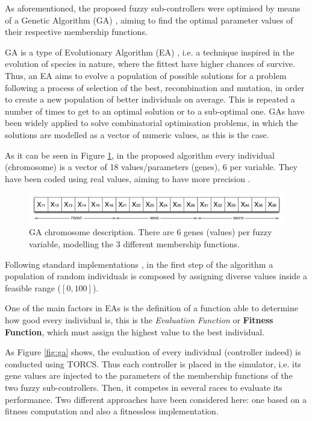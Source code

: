 \documentclass[10pt,journal,compsoc]{IEEEtran}
\begin{document}
As aforementioned, the proposed fuzzy sub-controllers were optimised by means of a Genetic Algorithm (GA) \cite{GAs_Goldberg89}, aiming to find the optimal parameter values of their respective membership functions.

GA is a type of Evolutionary Algorithm (EA) \cite{EAs_Back96}, i.e. a technique inspired in the evolution of species in nature, where the fittest have higher chances of survive. Thus, an EA aims to evolve a population of possible solutions for a problem following a process of selection of the best, recombination and mutation, in order to create a new population of better individuals on average. This is repeated a number of times to get to an optimal solution or to a sub-optimal one.
GAs have been widely applied to solve combinatorial optimisation problems, in which the solutions are modelled as a vector of numeric values, as this is the case.

As it can be seen in Figure \ref{fig:cromosome}, in the proposed algorithm every individual (chromosome) is a vector of 18 values/parameters (genes), 6 per variable. They have been coded using real values, aiming to have more precision \cite{elsayed13}. 

 \begin{figure}[!ht]	
 	\begin{center}
 		\includegraphics[width=12cm]{fig/chromosome2.png}
 		\caption{GA chromosome description. There are 6 genes (values) per fuzzy variable, modelling the 3 different membership functions.}
 		\label{fig:cromosome}	
 	\end{center}	
 \end{figure}

Following standard implementations \cite{GAs_Goldberg89}, in the first step of the algorithm \cite{salem_evo17} a population of random individuals is composed by assigning diverse values inside a feasible range ($[0,100]$).

One of the main factors in EAs is the definition of a function able to determine how good every individual is, this is the \textit{Evaluation Function} or \textbf{Fitness Function}, which must assign the highest value to the best individual.

As Figure \ref{fig:ga} shows, the evaluation of every individual (controller indeed) is conducted using TORCS. Thus each controller is placed in the simulator, i.e. its gene values are injected to the parameters of the membership functions of the two fuzzy sub-controllers. Then, it competes in several races to evaluate its performance.
Two different approaches have been considered here: one based on a fitness computation and also a fitnessless implementation.
\end{document}
